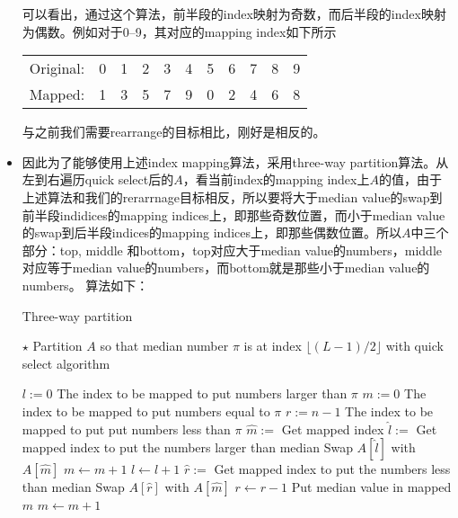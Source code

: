 \begin{itemize}
\begin{algorithm}[H]
\begin{algorithmic}[1]
\end{algorithmic}
\end{algorithm}
可以看出，通过这个算法，前半段的index映射为奇数，而后半段的index映射为偶数。例如对于0--9，其对应的mapping index如下所示
\begin{table}[H]
\begin{tabular}{l*{10}{c}}
Original: &  0 & 1 & 2 & 3 & 4 & 5 & 6 & 7 & 8 & 9 \\
Mapped: & 1  &  3 &   5 &   7 &  9 &   0  &  2  &  4 &   6 &   8
\end{tabular}
\end{table}
与之前我们需要rearrange的目标相比，刚好是相反的。
\item 因此为了能够使用上述index mapping算法，采用three-way partition算法。从左到右遍历quick select后的$A$，看当前index的mapping index上$A$的值，由于上述算法和我们的rerarrnage目标相反，所以要将大于median value的swap到前半段indidices的mapping indices上，即那些奇数位置，而小于median value的swap到后半段indices的mapping indices上，即那些偶数位置。所以$A$中三个部分：top, middle 和bottom，top对应大于median value的numbers，middle对应等于median value的numbers，而bottom就是那些小于median value的numbers。
算法如下：
\begin{algorithm}[H]
\caption{Three-way partition}
\begin{algorithmic}[1]
\State $\star$ Partition $A$ so that median number $\pi$ is at index  $\lfloor (L-1)/2\rfloor$ with quick select algorithm
\end{algorithmic}
\end{algorithm}
\begin{algorithm}[H]
\begin{algorithmic}[1]
\State $l:=0$ \Comment The index to be mapped to put numbers larger than $\pi$
\State $m:=0$ \Comment The index to be mapped to put numbers equal to $\pi$
\State $r:=n-1$ \Comment The index to be mapped to put put numbers less than $\pi$
\State $\hat{m}:=$  \Comment Get mapped index
\State $ \hat{l}:= $  \Comment Get mapped index to put the numbers larger than median
\State Swap $A[\hat{l}]$ with $A[\hat{m}]$
\State $m\gets m+1$
\State $l\gets l+1$
\State $ \hat{r}:= $  \Comment Get mapped index to put the numbers less than median
\State Swap $A[\hat{r}]$ with $A[\hat{m}]$
\State $r\gets r-1$
\Else \Comment Put median value in mapped $m$
\State $m\gets m+1$ 
\EndIf
\EndWhile
\EndProcedure
\end{algorithmic}
\end{algorithm}
\end{itemize}
